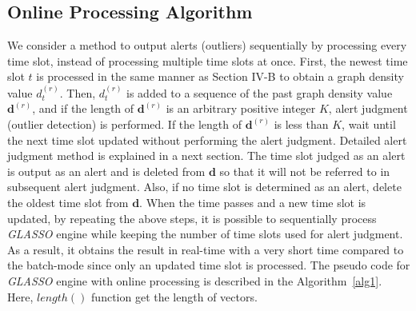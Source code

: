 \documentclass[conference]{IEEEtran}
\begin{document}
\subsection{Online Processing Algorithm}
We consider a method to output alerts (outliers) sequentially by processing every time slot, instead of processing multiple time slots at once.
First, the newest time slot $t$ is processed in the same manner as Section I\hspace{-.1em}V-B to obtain a graph density value $d_t^{(r)}$.
Then, $d_t^{(r)}$ is added to a sequence of the past graph density value $\bm{d}^{(r)}$, and if the length of $\bm{d}^{(r)}$ is an arbitrary positive integer $K$, alert judgment (outlier detection) is performed.
If the length of $\bm{d}^{(r)}$ is less than $K$, wait until the next time slot updated without performing the alert judgment.
Detailed alert judgment method is explained in a next section.
The time slot judged as an alert is output as an alert and is deleted from $\bm{d}$ so that it will not be referred to in subsequent alert judgment.
Also, if no time slot is determined as an alert, delete the oldest time slot from $\bm{d}$.
When the time passes and a new time slot is updated, by repeating the above steps, it is possible to sequentially process {\it GLASSO} engine while keeping the number of time slots used for alert judgment.
As a result, it obtains the result in real-time with a very short time compared to the batch-mode since only an updated time slot is processed.
The pseudo code for {\it GLASSO} engine with online processing is described in the Algorithm~\ref{alg1}.
Here, $length()$ function get the length of vectors.


\end{document}

